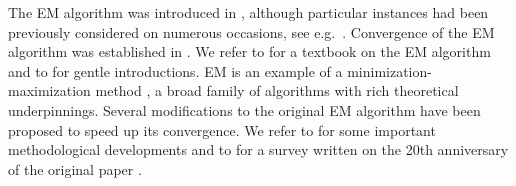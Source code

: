 The EM algorithm was introduced in \cite{55}, although particular instances had been previously
considered on numerous occasions, see e.g.\ \cite{43,106}. Convergence of the EM algorithm was
established in \cite{239}. We refer to \cite{158} for a textbook on the EM algorithm and to
\cite{27,107,152,28} for gentle introductions. EM is an example of a minimization-maximization
method \cite{115}, a broad family of algorithms with rich theoretical underpinnings. Several
modifications to the original EM algorithm have been proposed to speed up its convergence. We refer
to \cite{159,143,117,172} for some important methodological developments and to \cite{160} for a
survey written on the 20th anniversary of the original paper \cite{55}.
